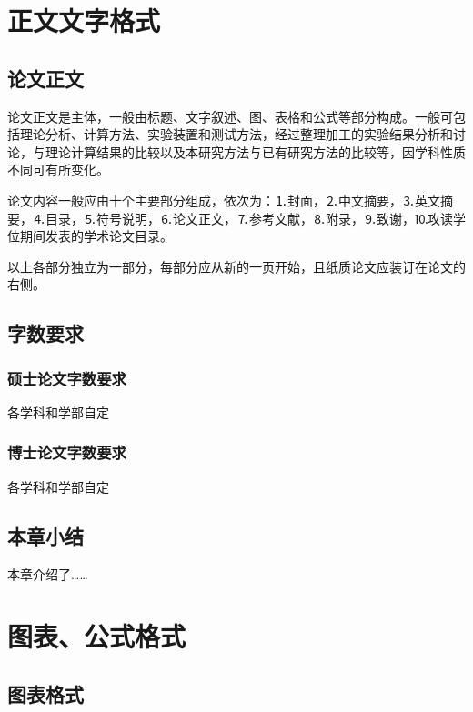 \newpage
{}
\section{正文文字格式}
\subsection{论文正文}
论文正文是主体，一般由标题、文字叙述、图、表格和公式等部分构成。一般可包括理论分析、计算方法、实验装置和测试方法，经过整理加工的实验结果分析和讨论，与理论计算结果的比较以及本研究方法与已有研究方法的比较等，因学科性质不同可有所变化。\par
论文内容一般应由十个主要部分组成，依次为：⒈封面，⒉中文摘要，⒊英文摘要，⒋目录，⒌符号说明，⒍论文正文，⒎参考文献，⒏附录，⒐致谢，⒑攻读学位期间发表的学术论文目录。\par
以上各部分独立为一部分，每部分应从新的一页开始，且纸质论文应装订在论文的右侧。\par
\subsection{字数要求}
\subsubsection{硕士论文字数要求}
各学科和学部自定
\subsubsection{博士论文字数要求}
各学科和学部自定
\subsection{本章小结}
本章介绍了……

\newpage
{}
\section{图表、公式格式}
\subsection{图表格式}

